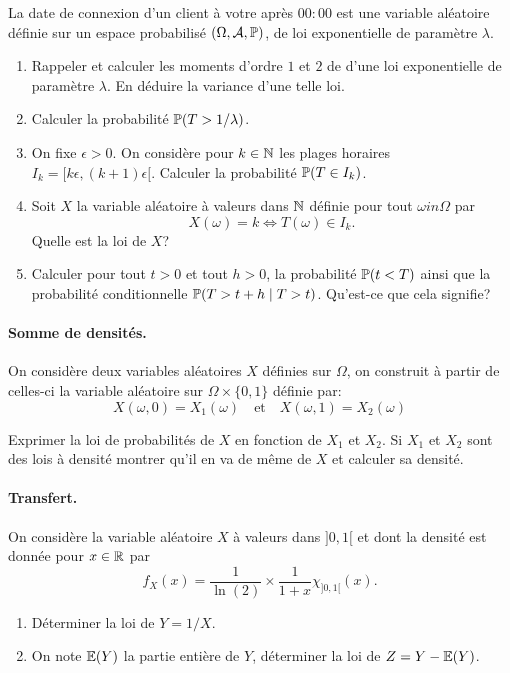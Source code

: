 \documentclass[11pt, a4paper]{article}
\begin{document}
La date de connexion d'un client à votre après $00:00$ est une
variable aléatoire définie sur un espace probabilisé
$(\Omega, \mathcal{A}, \mathbb{P})$, de loi exponentielle de paramètre
$\lambda$.
\begin{question}
  \begin{enumerate}
  \item
    Rappeler et calculer les moments d'ordre $1$ et $2$ de d'une loi
    exponentielle de paramètre $\lambda$. En déduire la variance d'une
    telle loi.
  \item
    Calculer la probabilité $\mathbb{P}(T > 1/\lambda)$.
  \item
    On fixe $\epsilon > 0$. On considère pour $k \in \mathbb{N}$ les plages
    horaires $I_k = [k\epsilon, (k+1)\epsilon[$. Calculer la
    probabilité $\mathbb{P}(T \in I_k)$.
  \item
    Soit $X$ la variable aléatoire à valeurs dans $\mathbb{N}$ définie pour
    tout $\omega in \Omega$ par
    \[
    X(\omega) = k \Leftrightarrow T(\omega) \in I_k.
    \]
    Quelle est la loi de $X$?
  \item
    Calculer pour tout $t > 0$ et tout $h > 0$, la probabilité
    $\mathbb{P}(t < T)$ ainsi que la probabilité conditionnelle
    $\mathbb{P}(T > t+h \mid T > t)$. Qu'est-ce que cela signifie?
  \end{enumerate}
\end{question}

\paragraph{Somme de densités.} On considère deux variables aléatoires
$X$ définies sur $\Omega$, on construit à partir de celles-ci la
variable aléatoire sur $\Omega \times \{0, 1\}$ définie par:
\[
X(\omega, 0) = X_1(\omega) \quad\textrm{et}\quad X(\omega, 1) = X_2(\omega)
\]
\begin{question}
  Exprimer la loi de probabilités de $X$ en fonction de $X_1$ et
  $X_2$. Si $X_1$ et $X_2$ sont des lois à densité montrer qu'il en va
  de même de $X$ et calculer sa densité.
\end{question}

\paragraph{Transfert.} On considère la variable aléatoire $X$ à valeurs
dans $]0, 1[$ et dont la densité est donnée pour $x \in \mathbb{R}$ par
\[
f_X(x) = \frac{1}{\ln(2)}\times \frac{1}{1+x}\chi_{]0, 1[}(x).
\]
\begin{question}
  \begin{enumerate}
  \item
    Déterminer la loi de $Y = 1/X$.
  \item
    On note $\mathbb{E}(Y)$ la partie entière de $Y$, déterminer la loi de
    $Z = Y - \mathbb{E}(Y)$.
  \end{enumerate}
\end{question}
\end{document}
